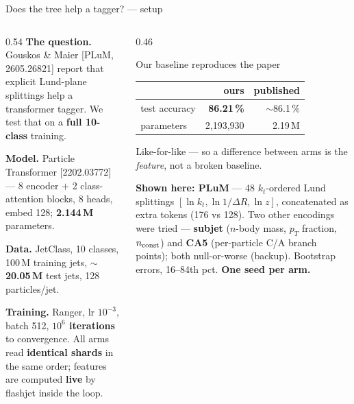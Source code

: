\documentclass[aspectratio=169,10pt]{beamer}
\newcommand{\smallnote}[1]{{\footnotesize\color{fjgray} #1}}
\begin{document}
\begin{frame}{Does the tree help a tagger? --- setup}
\begin{columns}[T]
\begin{column}{0.54\textwidth}
\textbf{The question.} Gouskos \& Maier [PLuM, 2605.26821] report that explicit
Lund-plane splittings help a transformer tagger. We test that on a
\textbf{full 10-class} training.
\medskip

\textbf{Model.} Particle Transformer [2202.03772] --- 8 encoder $+$ 2
class-attention blocks, 8 heads, embed 128; \textbf{2.144\,M} parameters.
\medskip

\textbf{Data.} JetClass, 10 classes, 100\,M training jets,
$\sim$\textbf{20.05\,M} test jets, 128 particles/jet.
\medskip

\textbf{Training.} Ranger, lr $10^{-3}$, batch 512, \textbf{$10^{6}$ iterations}
to convergence. All arms read \textbf{identical shards} in the same order;
features are computed \textbf{live} by flashjet inside the loop.
\end{column}
\begin{column}{0.46\textwidth}
\begin{block}{Our baseline reproduces the paper}
\small
\begin{tabular}{@{}lrr@{}}
\toprule
& ours & published\\
\midrule
test accuracy & \textbf{86.21\,\%} & $\sim$86.1\,\%\\
parameters & 2{,}193{,}930 & 2.19\,M\\
\bottomrule
\end{tabular}
\smallskip

\small Like-for-like --- so a difference between arms is the \emph{feature},
not a broken baseline.
\end{block}
\smallskip

\smallnote{\textbf{Shown here: PLuM} --- 48 $k_t$-ordered Lund splittings
$[\ln k_t, \ln 1/\Delta R, \ln z]$, concatenated as extra tokens (176 vs 128).
Two other encodings were tried --- \textbf{subjet} ($n$-body mass, $p_T$
fraction, $n_{\rm const}$) and \textbf{CA5} (per-particle C/A branch points);
both null-or-worse (backup). Bootstrap errors, 16--84th pct.
\textbf{One seed per arm.}}
\end{column}
\end{columns}
\end{frame}
\end{document}
